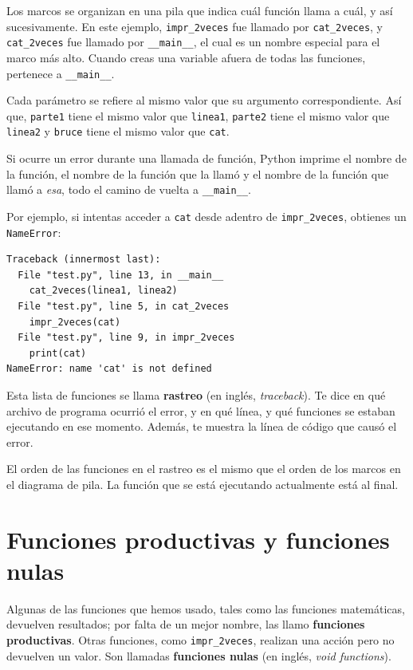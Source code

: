 \documentclass[10pt]{book}
\begin{document}
Los marcos se organizan en una pila que indica cuál función
llama a cuál, y así sucesivamente.  En este ejemplo, \verb"impr_2veces"
fue llamado por \verb"cat_2veces", y \verb"cat_2veces" fue llamado por
\verb"__main__", el cual es un nombre especial para el marco más alto.  Cuando
creas una variable afuera de todas las funciones, pertenece a
\verb"__main__".


Cada parámetro se refiere al mismo valor que su argumento
correspondiente.  Así que, {\tt parte1} tiene el mismo valor que
{\tt linea1}, {\tt parte2} tiene el mismo valor que {\tt linea2}
y {\tt bruce} tiene el mismo valor que {\tt cat}.

Si ocurre un error durante una llamada de función, Python imprime el
nombre de la función, el nombre de la función que la llamó
y el nombre de la función que llamó a {\em esa}, todo el
camino de vuelta a \verb"__main__".

Por ejemplo, si intentas acceder a {\tt cat} desde adentro de
\verb"impr_2veces", obtienes un {\tt NameError}:

\begin{verbatim}
Traceback (innermost last):
  File "test.py", line 13, in __main__
    cat_2veces(linea1, linea2)
  File "test.py", line 5, in cat_2veces
    impr_2veces(cat)
  File "test.py", line 9, in impr_2veces
    print(cat)
NameError: name 'cat' is not defined
\end{verbatim}
%
Esta lista de funciones se llama {\bf rastreo} (en inglés, {\em traceback}).  Te dice en qué
archivo de programa ocurrió el error, y en qué línea, y qué funciones
se estaban ejecutando en ese momento.  Además, te muestra la línea de código que
causó el error.

El orden de las funciones en el rastreo es el mismo que el
orden de los marcos en el diagrama de pila.  La función que se está
ejecutando actualmente está al final.


\section{Funciones productivas y funciones nulas}

Algunas de las funciones que hemos usado, tales como las funciones matemáticas, devuelven
resultados; por falta de un mejor nombre, las llamo {\bf funciones
  productivas}.  Otras funciones, como \verb"impr_2veces", realizan una
acción pero no devuelven un valor.  Son llamadas {\bf funciones
  nulas} (en inglés, {\em void functions}).
\end{document}
